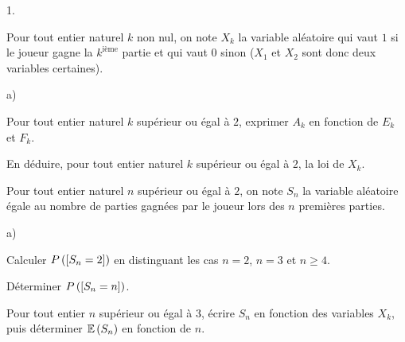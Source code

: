 \documentclass[11pt]{article}%
\begin{document}
\begin{noliste}{1.}
\item Pour tout entier naturel $k$ non nul, on note $X_{k}$ la variable
aléatoire qui vaut $1$ si le joueur gagne la $k^{\text{ième}}$ partie
et qui vaut $0$ sinon ($X_{1}$ et $X_{2}$ sont donc deux variables
certaines).

\begin{noliste}{a)}
 \setlength{\itemsep}{2mm}
\item Pour tout entier naturel $k$ supérieur ou égal à $2$, exprimer
$A_{k}$ en fonction de $E_{k}$ et $F_{k}$.

\item En déduire, pour tout entier naturel $k$ supérieur ou égal à $2$,
la loi de $X_{k}$.
\end{noliste}

\item Pour tout entier naturel $n$ supérieur ou égal à $2$, on note
$S_{n}$ la variable aléatoire égale au nombre de parties gagnées par le
joueur lors des $n$ premières parties.

\begin{noliste}{a)}
 \setlength{\itemsep}{2mm}
\item Calculer $P\left(\left[ { S_{n} = 2} \right]\right) $ en distinguant les cas
$n = 2$, $n = 3$
et $n\geq 4$.

\item Déterminer $P\left(\left[ { S_{n} = n} \right]\right) $.

\item Pour tout entier $n$ supérieur ou égal à 3, écrire $S_{n}$ en
fonction
des variables $X_{k}$, puis déterminer $\mathbb{E}\left( S_{n}\right) $ en
fonction
de $n$.
\end{noliste}
\end{noliste}

\label{fin}
\end{document}
